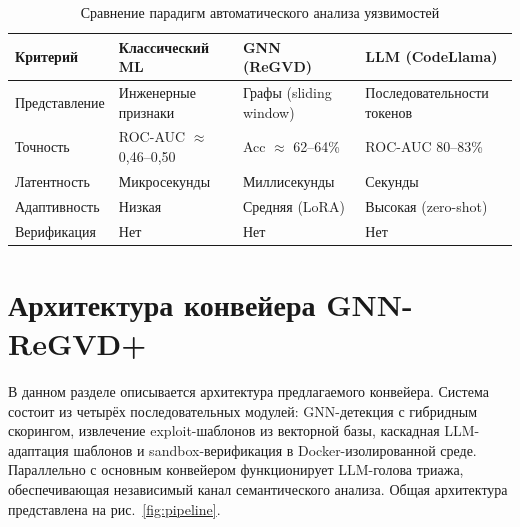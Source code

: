 \documentclass[runningheads]{llncs}
\begin{document}
\begin{table}
\centering
\caption{Сравнение парадигм автоматического анализа уязвимостей}
\label{tab:paradigms}
\small
\begin{tabular}{|p{2.0cm}|p{2.6cm}|p{2.8cm}|p{3.0cm}|}
\hline
\textbf{Критерий} & \textbf{Классический ML} & \textbf{GNN (ReGVD)} & \textbf{LLM (CodeLlama)} \\
\hline
Представление & Инженерные признаки & Графы (sliding window) & Последовательности токенов \\
Точность & ROC-AUC $\approx$ 0,46--0,50 & Acc $\approx$ 62--64\% & ROC-AUC 80--83\% \\
Латентность & Микросекунды & Миллисекунды & Секунды \\
Адаптивность & Низкая & Средняя (LoRA) & Высокая (zero-shot) \\
Верификация & Нет & Нет & Нет \\
\hline
\end{tabular}
\end{table}


\section{Архитектура конвейера GNN-ReGVD+}

В данном разделе описывается архитектура предлагаемого конвейера. Система состоит из четырёх последовательных модулей: GNN-детекция с гибридным скорингом, извлечение exploit-шаблонов из векторной базы, каскадная LLM-адаптация шаблонов и sandbox-верификация в Docker-изолированной среде. Параллельно с основным конвейером функционирует LLM-голова триажа, обеспечивающая независимый канал семантического анализа. Общая архитектура представлена на рис.~\ref{fig:pipeline}.
\end{document}
